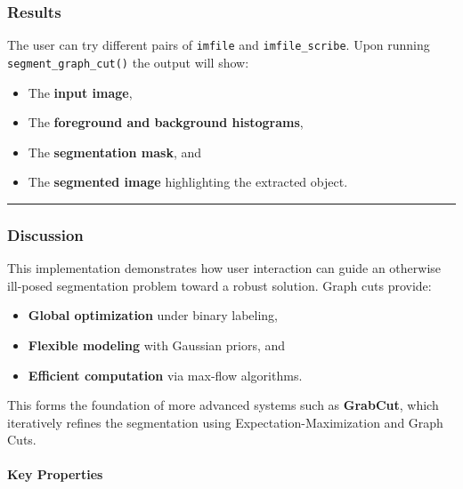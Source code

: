 \documentclass[11pt]{article}
\providecommand{\tightlist}{%
      \setlength{\itemsep}{0pt}\setlength{\parskip}{0pt}}
\begin{document}
\hypertarget{results}{%
\subsubsection{\texorpdfstring{\textbf{Results}}{Results}}\label{results}}

The user can try different pairs of \texttt{imfile} and
\texttt{imfile\_scribe}. Upon running \texttt{segment\_graph\_cut()} the
output will show:

\begin{itemize}
\tightlist
\item
  The \textbf{input image},
\item
  The \textbf{foreground and background histograms},
\item
  The \textbf{segmentation mask}, and
\item
  The \textbf{segmented image} highlighting the extracted object.
\end{itemize}

\begin{center}\rule{0.5\linewidth}{0.5pt}\end{center}

\hypertarget{discussion}{%
\subsubsection{\texorpdfstring{\textbf{Discussion}}{Discussion}}\label{discussion}}

This implementation demonstrates how user interaction can guide an
otherwise ill-posed segmentation problem toward a robust solution. Graph
cuts provide:

\begin{itemize}
\tightlist
\item
  \textbf{Global optimization} under binary labeling,
\item
  \textbf{Flexible modeling} with Gaussian priors, and
\item
  \textbf{Efficient computation} via max-flow algorithms.
\end{itemize}

This forms the foundation of more advanced systems such as
\textbf{GrabCut}, which iteratively refines the segmentation using
Expectation-Maximization and Graph Cuts.

\hypertarget{key-properties}{%
\paragraph{\texorpdfstring{\textbf{Key
Properties}}{Key Properties}}\label{key-properties}}
\end{document}
